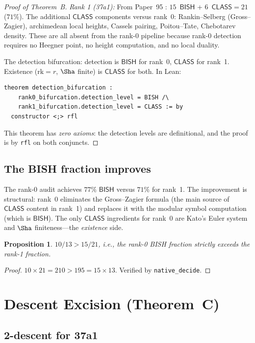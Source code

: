 \documentclass[11pt]{article}
\theoremstyle{plain}
\newtheorem{proposition}[theorem]{Proposition}
\theoremstyle{definition}
\theoremstyle{remark}
\newcommand{\rk}{\mathrm{rk}}
\newcommand{\BISH}{\ensuremath{\mathsf{BISH}}}
\newcommand{\CLASS}{\ensuremath{\mathsf{CLASS}}}
\begin{document}
\begin{proof}[Proof of Theorem~B]
\emph{Rank 1 (37a1):} From Paper~95 \cite{paper95}: $15$~$\BISH$ + $6$~$\CLASS = 21$ ($71\%$). The additional $\CLASS$ components versus rank~0: Rankin--Selberg (Gross--Zagier), archimedean local heights, Cassels pairing, Poitou--Tate, Chebotarev density. These are all absent from the rank-0 pipeline because rank-0 detection requires no Heegner point, no height computation, and no local duality.

The detection bifurcation: detection is $\BISH$ for rank~0, $\CLASS$ for rank~1. Existence ($\rk = r$, $\Sha$ finite) is $\CLASS$ for both. In Lean:
\begin{lstlisting}[style=leanstyle]
theorem detection_bifurcation :
    rank0_bifurcation.detection_level = BISH /\
    rank1_bifurcation.detection_level = CLASS := by
  constructor <;> rfl
\end{lstlisting}
This theorem has \emph{zero axioms}: the detection levels are definitional, and the proof is by \texttt{rfl} on both conjuncts.
\end{proof}

\subsection{The BISH fraction improves}

The rank-0 audit achieves $77\%$ $\BISH$ versus $71\%$ for rank~1. The improvement is structural: rank~0 eliminates the Gross--Zagier formula (the main source of $\CLASS$ content in rank~1) and replaces it with the modular symbol computation (which is $\BISH$). The only $\CLASS$ ingredients for rank~0 are Kato's Euler system and $\Sha$ finiteness---the \emph{existence} side.

\begin{proposition}\label{prop:fraction}
$10/13 > 15/21$, i.e., the rank-0 BISH fraction strictly exceeds the rank-1 fraction.
\end{proposition}

\begin{proof}
$10 \times 21 = 210 > 195 = 15 \times 13$. Verified by \texttt{native\_decide}.
\end{proof}


\section{Descent Excision (Theorem~C)}
\label{sec:descent}

\subsection{2-descent for 37a1}
\end{document}
